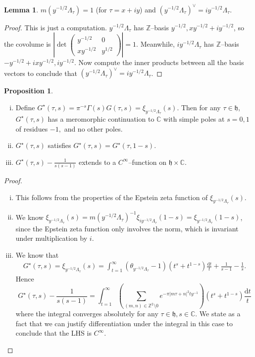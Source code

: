 \documentclass{article}
\theoremstyle{definition}
\newtheorem{lemma}[theorem]{Lemma}
\newtheorem{prop}[theorem]{Proposition}
\begin{document}
\begin{lemma}
    $m(y^{-1/2}\Lambda_{\tau}) = 1$ (for $\tau = x+iy$) and $(y^{-1/2}\Lambda_{\tau})^\vee = i y^{-1/2}\Lambda_{\tau}$.
\end{lemma}
\begin{proof}
This is just a computation. $y^{-1/2}\Lambda_{\tau}$ has $\mathbb{Z}$--basis $y^{-1/2}, xy^{-1/2} + iy^{-1/2}$, so the covolume is $\left| \det\begin{pmatrix} y^{-1/2} & 0 \\ xy^{-1/2} & y^{1/2} \end{pmatrix}\right| = 1$. Meanwhile, $i y^{-1/2}\Lambda_\tau$ has $\mathbb{Z}$--basis $-y^{-1/2} + i xy^{-1/2}, iy^{-1/2}$. Now compute the inner products between all the basis vectors to conclude that $(y^{-1/2}\Lambda_{\tau})^\vee = i y^{-1/2}\Lambda_{\tau}$.
\end{proof}
\begin{prop}
    \begin{enumerate}[(i)]
        \item Define $G^{\star}(\tau, s) = \pi^{-s}\Gamma(s)G(\tau,s) = \xi_{y^{-1/2}\Lambda_\tau}(s)$. Then for any $\tau \in \mathfrak{h}$, $G^{\star}(\tau, s)$ has a meromorphic continuation to $\mathbb{C}$ with simple poles at $s=0,1$ of residues $-1,$ and no other poles.
        \item $G^\star(\tau,s)$ satisfies $G^\star(\tau,s) = G^\star(\tau,1-s)$.
        \item $G^\star(\tau,s) - \frac{1}{s(s-1)}$ extends to a $C^{\infty}$--function on $\mathfrak{h} \times \mathbb{C}$.
    \end{enumerate}
\end{prop}
\begin{proof}
    \begin{enumerate}[(i)]
        \item This follows from the properties of the Epstein zeta function of $\xi_{y^{-1/2}\Lambda_{\tau}}(s)$.
        \item We know $\xi_{y^{-1/2}\Lambda_{\tau}}(s) = m(y^{-1/2}\Lambda_\tau)^{-1} \xi_{i y^{-1/2}\Lambda_{\tau}}(1-s) = \xi_{y^{-1/2}\Lambda_\tau}(1-s)$, since the Epstein zeta function only involves the norm, which is invariant under multiplication by $i$.
        \item We know that
        \begin{align*}
            G^\star(\tau, s) = \xi_{y^{-1/2}\Lambda_\tau}(s) = \int_{t=1}^{\infty} \left(\theta_{y^{-1/2}\Lambda_\tau}-1 \right)(t^s + t^{1-s})\frac{\mathrm{d}t}{t} + \frac{1}{s-1}-\frac{1}{s}.
        \end{align*}
        Hence $$G^\star(\tau,s) - \frac{1}{s(s-1)} = \int_{t=1}^{\infty} \left(\sum_{(m,n) \in \mathbb{Z}^2 \setminus 0}^{} e^{-\pi|m \tau + n|^2 t y^{-1}} \right)(t^s + t^{1-s})\frac{\mathrm{d}t}{t}$$ where the integral converges absolutely for any $\tau \in \mathfrak{h}, s \in \mathbb{C}$. We state as a fact that we can justify differentiation under the integral in this case to conclude that the LHS is $C^{\infty}$.
    \end{enumerate}
\end{proof}
\end{document}
